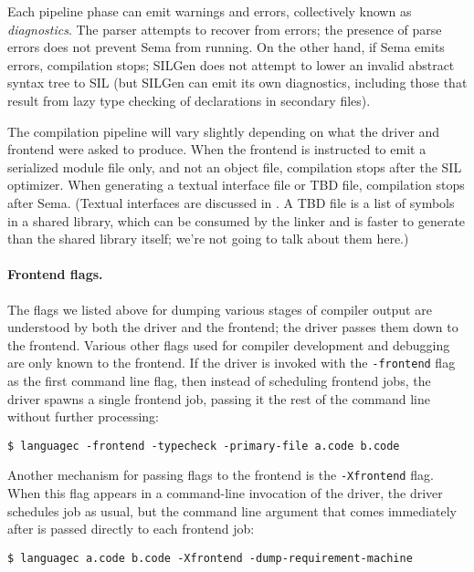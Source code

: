 \documentclass[../generics]{subfiles}
\begin{document}
Each pipeline phase can emit warnings and errors, collectively known as \emph{diagnostics}. The parser attempts to recover from errors; the presence of parse errors does not prevent Sema from running. On the other hand, if Sema emits errors, compilation stops; SILGen does not attempt to lower an invalid abstract syntax tree to SIL (but SILGen can emit its own diagnostics, including those that result from lazy type checking of declarations in secondary files).

The compilation pipeline will vary slightly depending on what the driver and frontend were asked to produce. When the frontend is instructed to emit a serialized module file only, and not an object file, compilation stops after the SIL optimizer. When generating a textual interface file or TBD file, compilation stops after Sema. (Textual interfaces are discussed in . A TBD file is a list of symbols in a shared library, which can be consumed by the linker and is faster to generate than the shared library itself; we're not going to talk about them here.)

\paragraph{Frontend flags.}
The flags we listed above for dumping various stages of compiler output are understood by both the driver and the frontend; the driver passes them down to the frontend. Various other flags used for compiler development and debugging are only known to the frontend. If the driver is invoked with the \texttt{-frontend} flag as the first command line flag, then instead of scheduling frontend jobs, the driver spawns a single frontend job, passing it the rest of the command line without further processing:
\begin{Verbatim}
$ languagec -frontend -typecheck -primary-file a.code b.code
\end{Verbatim}
Another mechanism for passing flags to the frontend is the \texttt{-Xfrontend} flag. When this flag appears in a command-line invocation of the driver, the driver schedules job as usual, but the command line argument that comes immediately after is passed directly to each frontend job:
\begin{Verbatim}
$ languagec a.code b.code -Xfrontend -dump-requirement-machine
\end{Verbatim}
\end{document}

